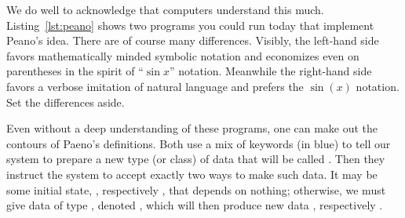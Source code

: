 We do well to acknowledge that computers understand this much.
Listing~\ref{lst:peano} shows two programs you could run today that implement Peano's idea.
There are of course many differences.  Visibly, the left-hand side 
favors mathematically minded symbolic notation and 
economizes even on parentheses in the spirit of ``$\sin x$'' notation.
Meanwhile the right-hand side favors a verbose imitation of 
natural language and prefers the $\sin(x)$ notation.  Set the differences 
aside.

Even without a deep understanding of these programs, one can 
make out the contours of Paeno's definitions.  Both use a mix of 
keywords (in blue) to tell our system to prepare a new type (or class) of data 
that will be called .  Then they instruct the system 
to accept exactly two ways to make such data.
It may be some initial state, , respectively 
, that depends on nothing;
otherwise, we must give data  of type ,
denoted , which will then produce new data 
, respectively .

